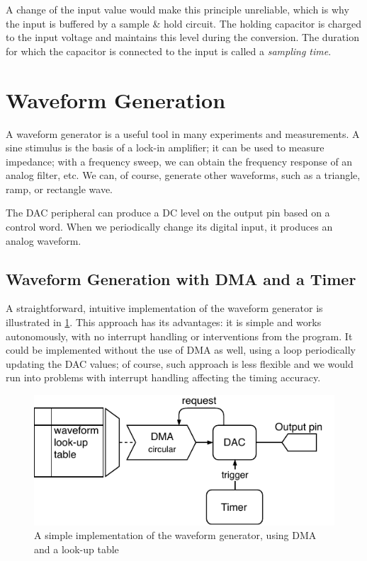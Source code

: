 A change of the input value would make this principle unreliable, which is why the input is buffered by a sample \& hold circuit. The holding capacitor is charged to the input voltage and maintains this level during the conversion. The duration for which the capacitor is connected to the input is called a \textit{sampling time}.

\section{Waveform Generation} \label{sec:theory-dac}

A waveform generator is a useful tool in many experiments and measurements. A sine stimulus is the basis of a lock-in amplifier; it can be used to measure impedance; with a frequency sweep, we can obtain the frequency response of an analog filter, etc. We can, of course, generate other waveforms, such as a triangle, ramp, or rectangle wave.

The \gls{DAC} peripheral can produce a \gls{DC} level on the output pin based on a control word. When we periodically change its digital input, it produces an analog waveform.

\subsection{Waveform Generation with DMA and a Timer} \label{sec:theory-dac-simple}

A straightforward, intuitive implementation of the waveform generator is illustrated in \cref{fig:wavegen-naive}. This approach has its advantages: it is simple and works autonomously, with no interrupt handling or interventions from the program. It could be implemented without the use of \gls{DMA} as well, using a loop periodically updating the \gls{DAC} values; of course, such approach is less flexible and we would run into problems with interrupt handling affecting the timing accuracy.

\begin{figure}[h]
	\centering
	\includegraphics[scale=1.1] {img/wavegen-naive.pdf}
	\caption[A simple implementation of the waveform generator]{\label{fig:wavegen-naive}A simple implementation of the waveform generator, using DMA and a look-up table}
\end{figure}

